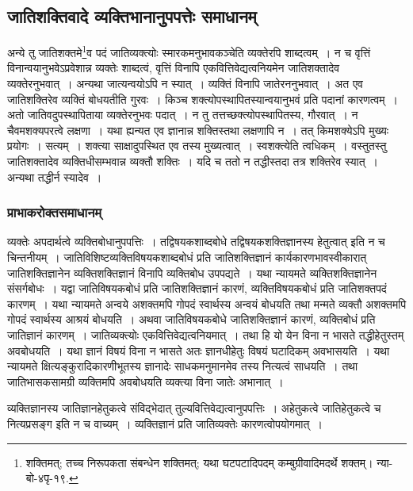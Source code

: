 		\subsection{जातिशक्तिवादे व्यक्तिभानानुपपत्तेः समाधानम्}

			\begin{small}
	
				अन्ये तु जातिशक्तमे\footnote{शक्तिमत्; तच्च निरूपकता संबन्धेन शक्तिमत्; यथा घटपटादिपदम् कम्बुग्रीवादिमदर्थे शक्तम्। न्या-बो-४पृ-१९.}व पदं जातिव्यक्त्योः स्मारकमनुभावकञ्चेति व्यक्तेरपि शाब्दत्वम्~। न च वृत्तिं विनान्वयानुभवेऽप्रवेशान्न व्यक्तेः शाब्दत्वं, वृत्तिं विनापि एकवित्तिवेद्यत्वनियमेन जातिशक्तादेव व्यक्तेरनुभवात्~। अन्यथा जात्यन्वयोऽपि न स्यात्~। व्यक्तिं विनापि जातेरननुभवात्~। अत एव जातिशक्तिरेव व्यक्तिं बोधयतीति गुरवः~। किञ्च शक्त्योपस्थापितस्यान्वयानुभवं प्रति पदानां कारणत्वम्~। अतो जातिवदुपस्थापिताया व्यक्तेरनुभवः पदात्~। न तु तत्तच्छक्त्योपस्थापितस्य, गौरवात्~। न चैवमशक्यपरत्वे लक्षणा~। यथा ह्यन्यत एव ज्ञानान्न शक्तिस्तथा लक्षणापि न~। तत् किमशक्येऽपि मुख्यः प्रयोगः~। सत्यम्~। शक्त्या साक्षादुपस्थित एव तस्य मुख्यत्वात्~। स्वशक्त्येति त्वधिकम्~। वस्तुतस्तु जातिशक्तादेव व्यक्तिधीसम्भवान्न व्यक्तौ शक्तिः~। यदि च ततो न तद्धीस्तदा तत्र शक्तिरेव स्यात्~। अन्यथा तद्धीर्न स्यादेव~। 
			\end{small}

			\subsubsection{प्राभाकरोक्तसमाधानम्}
				
				व्यक्तेः अपदार्थत्वे व्यक्तिबोधानुपपत्तिः~। तद्विषयकशाब्दबोधे तद्विषयकशक्तिज्ञानस्य हेतुत्वात् इति न च चिन्तनीयम्~। जातिविशिष्टव्यक्तिविषयकशाब्दबोधं प्रति जातिशक्तिज्ञानं कार्यकारणभावस्वीकारात् जातिशक्तिज्ञानेन व्यक्तिशक्तिज्ञानं विनापि व्यक्तिबोध उपपद्यते~। यथा न्यायमते व्यक्तिशक्तिज्ञानेन संसर्गबोधः~। यद्वा जातिविषयकबोधं प्रति जातिशक्तिज्ञानं कारणं, व्यक्तिविषयकबोधं प्रति जातिशक्तपदं कारणम्~। यथा न्यायमते अन्वये अशक्तमपि गोपदं स्वार्थस्य अन्वयं बोधयति तथा मन्मते व्यक्तौ अशक्तमपि गोपदं स्वार्थस्य आश्रयं बोधयति~। अथवा जातिविषयकबोधे जातिशक्तिज्ञानं कारणं, व्यक्तिबोधं प्रति जातिज्ञानं कारणम्~। जातिव्यक्त्योः एकवित्तिवेद्यत्वनियमात्~। तथा हि यो येन विना न भासते तद्धीहेतुस्तम् अवबोधयति~। यथा ज्ञानं विषयं विना न भासते अतः ज्ञानधीहेतुः विषयं घटादिकम् अवभासयति~। यथा न्यायमते क्षित्यङ्कुरादिकारणीभूतस्य ज्ञानादेः साधकमनुमानमेव तस्य नित्यत्वं साधयति~। तथा जातिभासकसामग्री व्यक्तिमपि अवबोधयति व्यक्त्या विना जातेः अभानात्~।

				व्यक्तिज्ञानस्य जातिज्ञानहेतुकत्वे संविद्भेदात् तुल्यवित्तिवेद्यत्वानुपपत्तिः~। अहेतुकत्वे जातिहेतुकत्वे च नित्यप्रसङ्ग इति न च वाच्यम्~। व्यक्तिज्ञानं प्रति जातिव्यक्तेः कारणत्वोपयोगमात्~।

